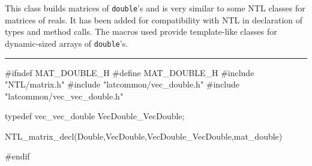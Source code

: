 % 
% 
% 
% 


This class builds matrices of \texttt{double}'s and is very similar to some NTL
classes for matrices of reals. It has been added for compatibility with NTL in 
declaration of types and method calls. The macros used provide template-like
classes for dynamic-sized arrays of \texttt{double}'s.



\bigskip\hrule
\code \hide
#ifndef MAT_DOUBLE_H
#define MAT_DOUBLE_H
\endhide
#include "NTL/matrix.h"
#include "latcommon/vec_double.h"
#include "latcommon/vec_vec_double.h"


typedef vec_vec_double VecDouble_VecDouble; 

NTL_matrix_decl(Double,VecDouble,VecDouble_VecDouble,mat_double)

\hide
#endif
\endhide
\endcode
